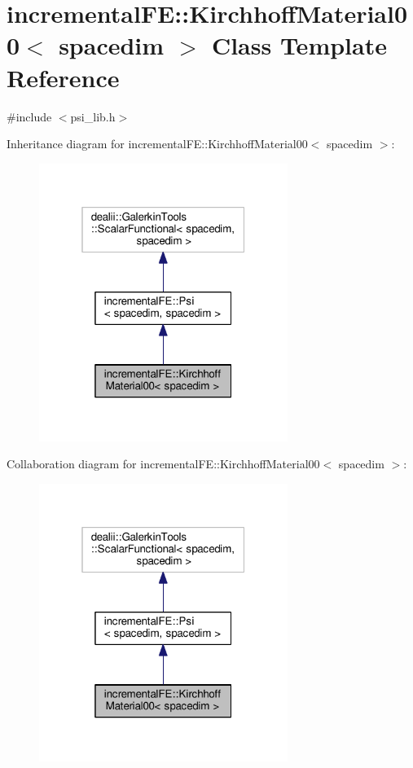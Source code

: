\hypertarget{classincremental_f_e_1_1_kirchhoff_material00}{}\section{incremental\+FE\+:\+:Kirchhoff\+Material00$<$ spacedim $>$ Class Template Reference}
\label{classincremental_f_e_1_1_kirchhoff_material00}


{\ttfamily \#include $<$psi\+\_\+lib.\+h$>$}



Inheritance diagram for incremental\+FE\+:\+:Kirchhoff\+Material00$<$ spacedim $>$\+:\nopagebreak
\begin{figure}[H]
\begin{center}
\leavevmode
\includegraphics[width=229pt]{classincremental_f_e_1_1_kirchhoff_material00__inherit__graph}
\end{center}
\end{figure}


Collaboration diagram for incremental\+FE\+:\+:Kirchhoff\+Material00$<$ spacedim $>$\+:\nopagebreak
\begin{figure}[H]
\begin{center}
\leavevmode
\includegraphics[width=229pt]{classincremental_f_e_1_1_kirchhoff_material00__coll__graph}
\end{center}
\end{figure}
